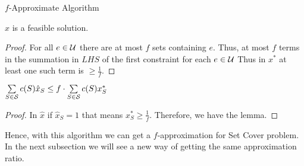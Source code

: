 \begin{algorithm}\DontPrintSemicolon
	\caption{$f$-Approximate Algorithm}
\end{algorithm}
\begin{lemma}{}{}
	$\hat{x}$ is a feasible solution.
\end{lemma}
\begin{proof}
	For all $e\in \mathcal{U}$ there are at most $f$ sets containing $e$. Thus, at most $f$ terms in the summation in $LHS$ of the first constraint for each $e\in \mathcal{U}$ Thus in $x^*$ at least one such term is $\geq \frac1f$.
\end{proof}
\begin{lemma}{}{}
	$\sum\limits_{S\in \mathcal{S}}c(S)\hat{x}_S\leq f\cdot \sum\limits_{S\in\mathcal{S}}c(S)x^*_S$
\end{lemma}
\begin{proof}
	In $\hat{x}$ if $\hat{x}_S=1$ that means $x^*_S\geq \frac1f$. Therefore, we have the lemma.
\end{proof}

Hence, with this algorithm we can get a $f$-approximation for Set Cover problem. In the next subsection we will see a new way of getting the same approximation ratio.

